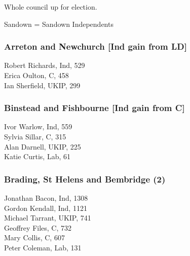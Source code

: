 \documentclass[a4paper,openany,10pt]{book}
\begin{document}
Whole council up for election.

Sandown = Sandown Independents



\subsubsection*{Arreton and Newchurch \hspace*{\fill}\nolinebreak[1]%
\enspace\hspace*{\fill}
[Ind gain from LD]}



Robert Richards, Ind, 529\\
Erica Oulton, C, 458\\
Ian Sherfield, UKIP, 299\\


\subsubsection*{Binstead and Fishbourne \hspace*{\fill}\nolinebreak[1]%
\enspace\hspace*{\fill}
[Ind gain from C]}



Ivor Warlow, Ind, 559\\
Sylvia Sillar, C, 315\\
Alan Darnell, UKIP, 225\\
Katie Curtis, Lab, 61\\


\subsubsection*{Brading, St Helens and Bembridge (2)}



Jonathan Bacon, Ind, 1308\\
Gordon Kendall, Ind, 1121\\
Michael Tarrant, UKIP, 741\\
Geoffrey Files, C, 732\\
Mary Collis, C, 607\\
Peter Coleman, Lab, 131\\
\end{document}
